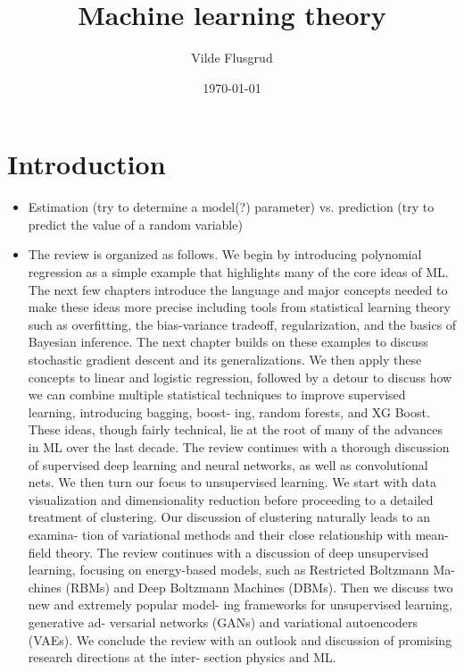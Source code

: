 \documentclass[norsk,a4paper,11pt]{article}
\title{Machine learning theory}
\author{Vilde Flusgrud}
\begin{document}
\date{\today}
\maketitle

\section{Introduction}
	\begin{itemize}
		\item Estimation (try to determine a model(?) parameter) vs. prediction (try to predict the value of a random variable)
		\item The review is organized as follows. We begin by introducing polynomial regression as a simple example that highlights many of the core ideas of ML. The next few chapters introduce the language and major concepts needed to make these ideas more precise including tools from statistical learning theory such as overfitting, the bias-variance tradeoff, regularization, and the basics of Bayesian inference. The next chapter builds on these examples to discuss stochastic gradient descent and its generalizations. We then apply these concepts to linear and logistic regression, followed by a detour to discuss how we can combine multiple statistical techniques to improve supervised learning, introducing bagging, boost- ing, random forests, and XG Boost. These ideas, though fairly technical, lie at the root of many of the advances in ML over the last decade. The review continues with a thorough discussion of supervised deep learning and neural networks, as well as convolutional nets. We then turn our focus to unsupervised learning. We start with data visualization and dimensionality reduction before proceeding to a detailed treatment of clustering. Our discussion of clustering naturally leads to an examina- tion of variational methods and their close relationship with mean-field theory. The review continues with a discussion of deep unsupervised learning, focusing on energy-based models, such as Restricted Boltzmann Ma- chines (RBMs) and Deep Boltzmann Machines (DBMs). Then we discuss two new and extremely popular model- ing frameworks for unsupervised learning, generative ad- versarial networks (GANs) and variational autoencoders (VAEs). We conclude the review with an outlook and discussion of promising research directions at the inter- section physics and ML.
	\end{itemize}
	
\end{document}
